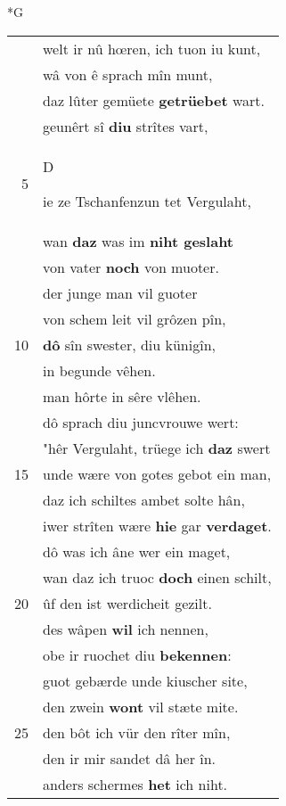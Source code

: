 \documentclass[8pt,a4paper,notitlepage]{article}
\begin{document}
\begin{table}[ht]
\begin{minipage}[t]{0.5\linewidth}
\small
\begin{center}*G
\end{center}
\begin{tabular}{rl}
 & welt ir nû hœren, ich tuon iu kunt,\\ 
 & wâ von ê sprach mîn munt,\\ 
 & daz lûter gemüete \textbf{getrüebet} wart.\\ 
 & geunêrt sî \textbf{diu} strîtes vart,\\ 
5 & \begin{large}D\end{large}ie ze Tschanfenzun tet Vergulaht,\\ 
 & wan \textbf{daz} was im \textbf{niht geslaht}\\ 
 & von vater \textbf{noch} von muoter.\\ 
 & der junge man vil guoter\\ 
 & von schem leit vil grôzen pîn,\\ 
10 & \textbf{dô} sîn swester, diu künigîn,\\ 
 & in begunde vêhen.\\ 
 & man hôrte in sêre vlêhen.\\ 
 & dô sprach diu juncvrouwe wert:\\ 
 & "hêr Vergulaht, trüege ich \textbf{daz} swert\\ 
15 & unde wære von gotes gebot ein man,\\ 
 & daz ich schiltes ambet solte hân,\\ 
 & iwer strîten wære \textbf{hie} gar \textbf{verdaget}.\\ 
 & dô was ich âne wer ein maget,\\ 
 & wan daz ich truoc \textbf{doch} einen schilt,\\ 
20 & ûf den ist werdicheit gezilt.\\ 
 & des wâpen \textbf{wil} ich nennen,\\ 
 & obe ir ruochet diu \textbf{bekennen}:\\ 
 & guot gebærde unde kiuscher site,\\ 
 & den zwein \textbf{wont} vil stæte mite.\\ 
25 & den bôt ich vür den rîter mîn,\\ 
 & den ir mir sandet dâ her în.\\ 
 & anders schermes \textbf{het} ich niht.\\ 

\end{tabular}
\end{minipage}
\end{table}
\end{document}
